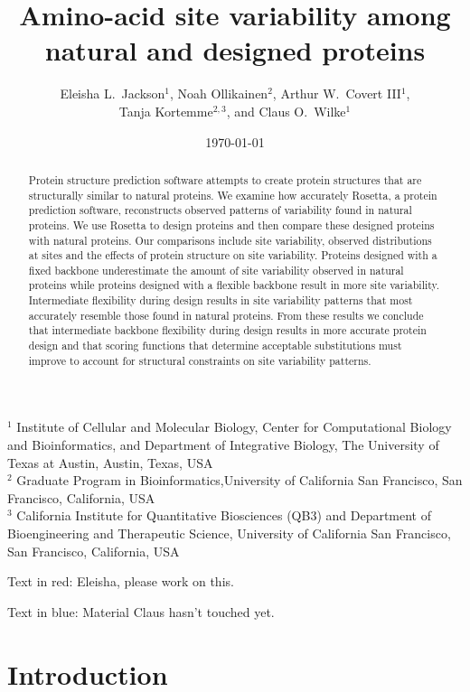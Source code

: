 \documentclass[12pt]{article}
\title{Amino-acid site variability among natural and designed proteins}
\author{Eleisha L.\ Jackson$^1$, Noah Ollikainen$^2$, Arthur W.\ Covert III$^1$,\\ Tanja Kortemme$^{2,3}$, and Claus O.\ Wilke$^1$}
\begin{document}
\date{\today}
\maketitle

\noindent
$^1$ Institute of Cellular and Molecular Biology, Center for Computational Biology and Bioinformatics, and Department of Integrative Biology, The University of Texas at Austin, Austin, Texas, USA\\
$^2$ Graduate Program in Bioinformatics,University of California San Francisco, San Francisco, California, USA\\
$^3$ California Institute for Quantitative Biosciences (QB3) and Department of Bioengineering and Therapeutic Science, University of California San Francisco, San Francisco, California, USA

\bigskip

\noindent
{\color{red}Text in red: Eleisha, please work on this.}

\noindent
{\color{blue}Text in blue: Material Claus hasn't touched yet.}

\begin{abstract}
{\color{blue}
Protein structure prediction software attempts to create protein structures that are structurally similar to natural proteins. We examine how accurately Rosetta, a protein prediction software, reconstructs observed patterns of variability found in natural proteins. We use Rosetta to design proteins and then compare these designed proteins with natural proteins. Our comparisons include site variability, observed distributions at sites and the effects of protein structure on site variability. Proteins designed with a fixed backbone underestimate the amount of site variability observed in natural proteins while proteins designed with a flexible backbone result in more site variability. Intermediate flexibility during design results in site variability patterns that most accurately resemble those found in natural proteins. From these results we conclude that intermediate backbone flexibility during design results in more accurate protein design and that scoring functions that determine acceptable substitutions must improve to account for structural constraints on site variability patterns.
}
\end{abstract}

\section{Introduction}
\label{Introduction}
\end{document}
